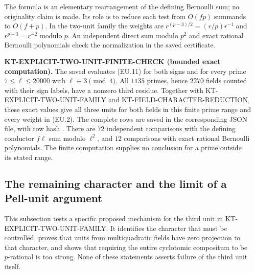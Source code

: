 \documentclass[11pt,a4paper]{article}
\theoremstyle{definition}
\renewcommand{\paragraph}[1]{\par\smallskip\noindent\textbf{#1}\quad\ignorespaces}
\begin{document}
The formula is an elementary rearrangement of the defining Bernoulli
sum; no originality claim is made.  Its role is to reduce each test
from $O(fp)$ summands to $O(f+p)$.  In the two-unit family the weights
are $r^{(p-3)/2}=(r/p)r^{-1}$ and $r^{p-3}=r^{-2}$ modulo $p$.
An independent direct sum modulo $p^2$ and exact rational Bernoulli
polynomials check the normalization in the saved certificate.

\paragraph{KT-EXPLICIT-TWO-UNIT-FINITE-CHECK (bounded exact computation).}
The saved  evaluates
(EU.11) for both signs and for every prime
$7\leq\ell\leq20000$ with $\ell\equiv3\pmod4$.
All $1135$ primes, hence $2270$ fields counted with their sign labels,
have a nonzero third residue.  Together with
KT-EXPLICIT-TWO-UNIT-FAMILY and KT-FIELD-CHARACTER-REDUCTION, these
exact values give all three units for both fields in this finite
prime range and every weight in (EU.2).
The complete rows are saved in the corresponding JSON file, with
row hash
.
There are $72$ independent comparisons with the defining conductor
$f\ell$ sum modulo $\ell^2$, and $12$ comparisons with exact rational
Bernoulli polynomials.  The finite computation supplies no conclusion
for a prime outside its stated range.



\subsection{The remaining character and the limit of a Pell-unit argument}
\label{sec:kt-third-unit-character}

This subsection tests a specific proposed mechanism for the third unit in
KT-EXPLICIT-TWO-UNIT-FAMILY.  It identifies the character that must be
controlled, proves that units from multiquadratic fields have zero
projection to that character, and shows that requiring the entire
cyclotomic compositum to be $p$-rational is too strong.  None of these
statements asserts failure of the third unit itself.
\end{document}
